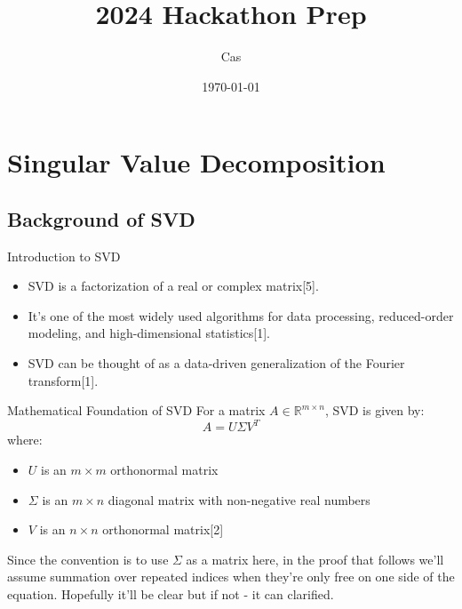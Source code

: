\documentclass{beamer}
\title{2024 Hackathon Prep}
\author{Cas}
\date{\today}
\begin{document}
\frame{\titlepage}

\section{Singular Value Decomposition}
\sectionpage
\subsection{Background of SVD}
\begin{frame}{Introduction to SVD}
    \begin{itemize}
        \item SVD is a factorization of a real or complex matrix[5].
        \item It's one of the most widely used algorithms for data processing, reduced-order modeling, and high-dimensional statistics[1].
        \item SVD can be thought of as a data-driven generalization of the Fourier transform[1].
    \end{itemize}
\end{frame}

\begin{frame}{Mathematical Foundation of SVD}
    For a matrix $A \in \mathbb{R}^{m \times n}$, SVD is given by:
    \[
    A = U\Sigma V^T
    \]
    where:
    \begin{itemize}
        \item $U$ is an $m \times m$ orthonormal matrix
        \item $\Sigma$ is an $m \times n$ diagonal matrix with non-negative real numbers
        \item $V$ is an $n \times n$ orthonormal matrix[2]
    \end{itemize}
    Since the convention is to use $\Sigma$ as a matrix here, in the proof that follows we'll assume summation over repeated indices when they're only free on one side of the equation. Hopefully it'll be clear but if not - it can clarified.
\end{frame}
\end{document}
